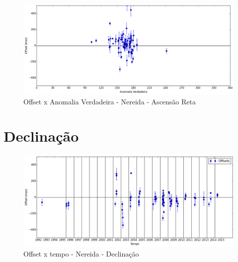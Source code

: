 \documentclass[11pt,a4paper]{report}
\begin{document}
\begin{figure}[h]
\caption{Offset x Anomalia Verdadeira - Nereida - Ascensão Reta}
\includegraphics[scale=0.45]{Nereida/RA_anom.png}  
\end{figure}


\section*{Declinação}

\begin{figure}[h]
\caption{Offset x tempo - Nereida - Declinação}
\includegraphics[scale=0.45]{Nereida/DEC.png} 
\end{figure}
\end{document}
